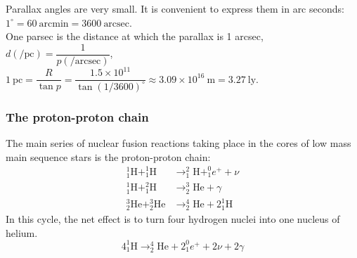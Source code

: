 \documentclass[a4paper,12pt]{article}
\begin{document}
\begin{center}
\end{center}
Parallax angles are very small. It is convenient to express them in arc seconds: $1^\circ=60\ \text{arcmin}=3600\ \text{arcsec}$.\\
One parsec is the distance at which the parallax is 1 arcsec, $d(/\text{pc})=\dfrac{1}{p(/\text{arcsec})}$, $1\ \text{pc}=\dfrac{R}{\tan p}=\dfrac{1.5\times 10^{11}}{\tan (1/3600)^\circ}\approx3.09\times 10^{16}\ \text{m} = 3.27\ \text{ly}$.
\subsubsection*{The proton-proton chain}
The main series of nuclear fusion reactions taking place in the cores of low mass main sequence stars is the proton-proton chain:
\[
\begin{aligned}
  ^1_1\text{H}+^1_1\text{H}&\rightarrow ^2_1\text{H}+^0_1e^++\nu\\
  ^1_1\text{H}+^2_1\text{H}&\rightarrow ^3_2\text{He}+\gamma\\
  ^3_2\text{He}+^3_2\text{He}&\rightarrow ^4_2\text{He}+2^1_1\text{H}
\end{aligned}\]
In this cycle, the net effect is to turn four hydrogen nuclei into one nucleus of helium. 
\[4^1_1\text{H}\rightarrow ^4_2\text{He}+2^0_1e^++2\nu +2\gamma\]
\end{document}
